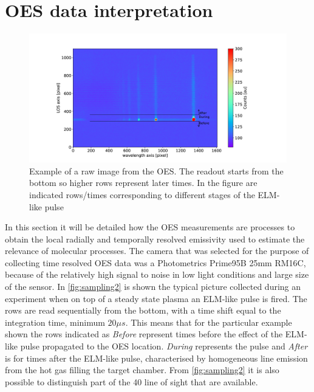 \section{OES data interpretation}\label{OES data interpretation}

\begin{figure}
	\centering
	\includegraphics[width=0.7\linewidth,trim={440 50 600 150},clip]{Chapters/chapter3/figs/sample_oes.png}
	\caption{Example of a raw image from the OES. The readout starts from the bottom so higher rows represent later times. In the figure are indicated rows/times corresponding to different stages of the ELM-like pulse}
	\label{fig:sampling2}
\end{figure}

In this section it will be detailed how the OES measurements are processes to obtain the local radially and temporally resolved emissivity used to estimate the relevance of molecular processes.
The camera that was selected for the purpose of collecting time resolved OES data was a Photometrics Prime95B 25mm RM16C, because of the relatively high signal to noise in low light conditions and large size of the sensor. In \autoref{fig:sampling2} is shown the typical picture collected during an experiment when on top of a steady state plasma an ELM-like pulse is fired. The rows are read sequentially from the bottom, with a time shift equal to the integration time, minimum $20\mu s$. This means that for the particular example shown the rows indicated as \emph{Before} represent times before the effect of the ELM-like pulse propagated to the OES location. \emph{During} represents the pulse and \emph{After} is for times after the ELM-like pulse, characterised by homogeneous line emission from the hot gas filling the target chamber. From \autoref{fig:sampling2} it is also possible to distinguish part of the 40 line of sight that are available.

